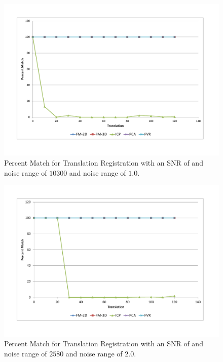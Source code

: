 \begin{figure}[t]
\centering
\includegraphics[width=6.0in]{images/results/noise/TransNoise1}
\caption{Percent Match for Translation Registration with an SNR of and noise range of $10300$ and noise range of $1.0$.}
\label{fig:TNoise1}
\end{figure}


\begin{figure}[t]
\centering
\includegraphics[width=6.0in]{images/results/noise/TransNoise2}
\caption{Percent Match for Translation Registration with an SNR of and noise range of $2580$ and noise range of $2.0$.}
\label{fig:TNoise2}
\end{figure}
